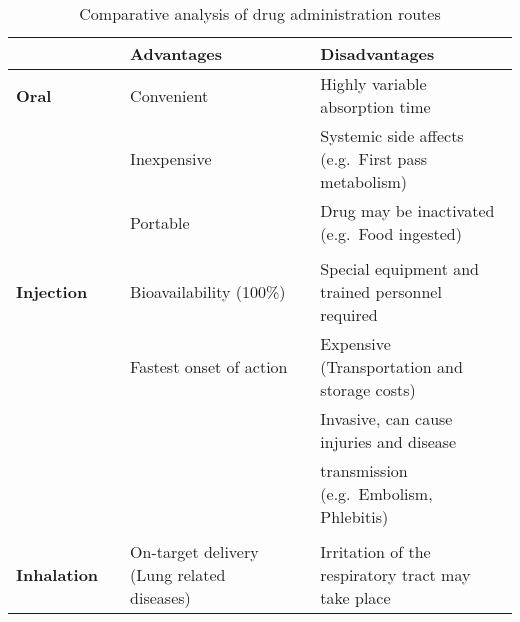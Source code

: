 \begin{table*}[!htbp]
	\footnotesize
	\centering
	\caption{Comparative analysis of drug administration routes}
	\label{tbl: 1.1a}
	\renewcommand{\arraystretch}{0.8}
	\begin{tabular}{@{}lllll@{}}
		\toprule[1pt]
		&  & \textbf{Advantages}     & \textbf{} & \textbf{Disadvantages}                                                                                             \\ \midrule
		\textbf{Oral}       &  & Convenient              &           & Highly variable absorption time                                                                                    \\
		&  & Inexpensive             &           & Systemic side affects (e.g.\ First pass metabolism)                                                                 \\
		&  & Portable                &           & Drug may be inactivated (e.g.\ Food ingested)                                                                       \\
		&  &                         &           &                                                                                                                    \\
		\textbf{Injection}  &  & Bioavailability (100\%) &           & Special equipment and trained personnel required                                                                   \\
		&  & Fastest onset of action &           & Expensive (Transportation and storage costs)                                                                                \\
		&  &                         &           & Invasive, can cause injuries and disease \\
		&  &                         &           & transmission (e.g.\ Embolism, Phlebitis)                                                                                                                   \\
		&  &                         &           &                                                                                                                    \\
		\textbf{Inhalation} &  &  On-target delivery (Lung related diseases)             &           & Irritation of the respiratory tract may take place                                               \\

\end{tabular}
\end{table*}
